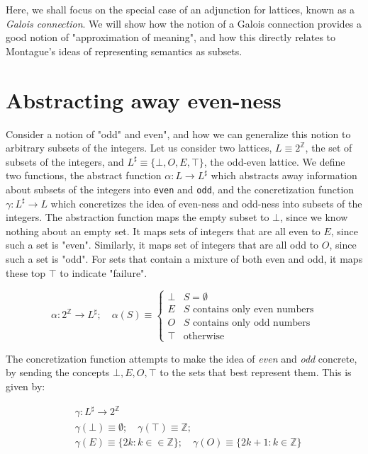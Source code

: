 \documentclass[11pt]{book}
\newcommand{\Z}{\ensuremath{\mathbb Z}}
\begin{document}
Here, we shall focus on the special case of an adjunction for lattices, known as a \emph{Galois connection}. We will show how the notion of a Galois connection provides a good notion of "approximation of meaning", and how this directly relates to Montague's ideas of representing semantics as subsets.

\section{Abstracting away even-ness}

Consider a notion of "odd" and even", and how we can generalize this notion to arbitrary subsets of the integers.
Let us consider two lattices, $L \equiv 2^\Z$, the set of subsets of the integers, and $L^\sharp \equiv \{\bot, O, E, \top\}$,
the odd-even lattice. We define two functions, the abstract function $\alpha: L \rightarrow L^\sharp$ which abstracts away information about subsets of the integers into \texttt{even} and \texttt{odd}, and the concretization function $\gamma: L^\sharp \rightarrow L$ which
concretizes the idea of even-ness and odd-ness into subsets of the integers. The abstraction function maps the empty subset to $\bot$, since we know nothing about an empty set. It maps sets of integers that are all even to $E$, since such a set is "even". Similarly, it maps set of integers that are all odd to  $O$, since such a set is "odd". For sets that contain a mixture of both even and odd, it maps these top $\top$ to indicate "failure".

\[
	\alpha: 2^\Z\rightarrow L^\sharp; \quad
	\alpha(S) \equiv
	\begin{cases}
		\bot & S = \emptyset \\
		E & \text{$S$ contains only even numbers} \\
		O & \text{$S$ contains only odd numbers} \\
		\top & \text{otherwise}
	\end{cases}
\]

The concretization function attempts to make the idea of \emph{even} and \emph{odd} concrete, by sending the concepts $\bot, E, O, \top$ to the sets that best represent them. This is given by:

\begin{align*}
&\gamma: L^\sharp \rightarrow 2^\Z \\
&\gamma(\bot) \equiv \emptyset; \quad \gamma(\top) \equiv \Z; \\
&\gamma(E) \equiv \{ 2 k : k \in \in \Z\}; \quad
\gamma(O) \equiv \{ 2k + 1: k \in \Z \}
\end{align*}
\end{document}
